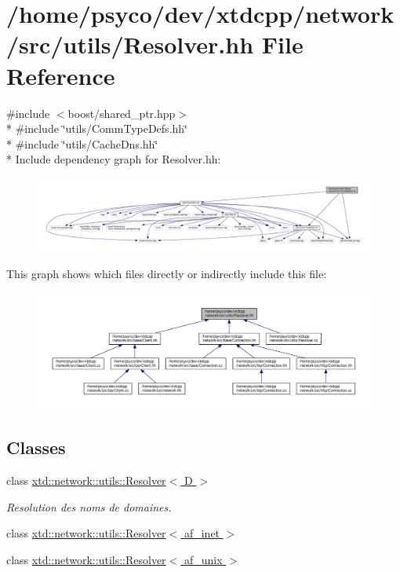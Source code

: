 \hypertarget{Resolver_8hh}{}\section{/home/psyco/dev/xtdcpp/network/src/utils/\+Resolver.hh File Reference}
\label{Resolver_8hh}
{\ttfamily \#include $<$boost/shared\+\_\+ptr.\+hpp$>$}\\*
{\ttfamily \#include \char`\"{}utils/\+Comm\+Type\+Defs.\+hh\char`\"{}}\\*
{\ttfamily \#include \char`\"{}utils/\+Cache\+Dns.\+hh\char`\"{}}\\*
Include dependency graph for Resolver.\+hh\+:
\nopagebreak
\begin{figure}[H]
\begin{center}
\leavevmode
\includegraphics[width=350pt]{Resolver_8hh__incl}
\end{center}
\end{figure}
This graph shows which files directly or indirectly include this file\+:
\nopagebreak
\begin{figure}[H]
\begin{center}
\leavevmode
\includegraphics[width=350pt]{Resolver_8hh__dep__incl}
\end{center}
\end{figure}
\subsection*{Classes}
\begin{DoxyCompactItemize}
\item 
class \hyperlink{classxtd_1_1network_1_1utils_1_1Resolver}{xtd\+::network\+::utils\+::\+Resolver$<$ D $>$}
\begin{DoxyCompactList}\small\item\em Resolution des noms de domaines. \end{DoxyCompactList}\item 
class \hyperlink{classxtd_1_1network_1_1utils_1_1Resolver_3_01af__inet_01_4}{xtd\+::network\+::utils\+::\+Resolver$<$ af\+\_\+inet $>$}
\item 
class \hyperlink{classxtd_1_1network_1_1utils_1_1Resolver_3_01af__unix_01_4}{xtd\+::network\+::utils\+::\+Resolver$<$ af\+\_\+unix $>$}
\end{DoxyCompactItemize}
